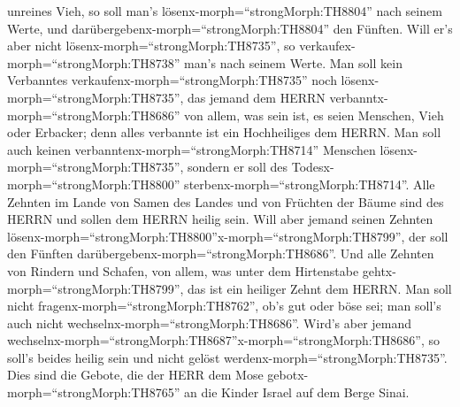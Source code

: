 unreines Vieh, so soll man's lösenx-morph=``strongMorph:TH8804'' nach
seinem Werte, und darübergebenx-morph=``strongMorph:TH8804'' den
Fünften. Will er's aber nicht lösenx-morph=``strongMorph:TH8735'', so
verkaufex-morph=``strongMorph:TH8738'' man's nach seinem Werte.
 Man soll kein Verbanntes
verkaufenx-morph=``strongMorph:TH8735'' noch
lösenx-morph=``strongMorph:TH8735'', das jemand dem HERRN
verbanntx-morph=``strongMorph:TH8686'' von allem, was sein ist, es seien
Menschen, Vieh oder Erbacker; denn alles verbannte ist ein Hochheiliges
dem HERRN.  Man soll auch keinen
verbanntenx-morph=``strongMorph:TH8714'' Menschen
lösenx-morph=``strongMorph:TH8735'', sondern er soll des
Todesx-morph=``strongMorph:TH8800''
sterbenx-morph=``strongMorph:TH8714''.  Alle Zehnten im
Lande von Samen des Landes und von Früchten der Bäume sind des HERRN und
sollen dem HERRN heilig sein.  Will aber jemand seinen
Zehnten
lösenx-morph=``strongMorph:TH8800''x-morph=``strongMorph:TH8799'', der
soll den Fünften darübergebenx-morph=``strongMorph:TH8686''.
 Und alle Zehnten von Rindern und Schafen, von allem, was
unter dem Hirtenstabe gehtx-morph=``strongMorph:TH8799'', das ist ein
heiliger Zehnt dem HERRN.  Man soll nicht
fragenx-morph=``strongMorph:TH8762'', ob's gut oder böse sei; man soll's
auch nicht wechselnx-morph=``strongMorph:TH8686''. Wird's aber jemand
wechselnx-morph=``strongMorph:TH8687''x-morph=``strongMorph:TH8686'', so
soll's beides heilig sein und nicht gelöst
werdenx-morph=``strongMorph:TH8735''.  Dies sind die
Gebote, die der HERR dem Mose gebotx-morph=``strongMorph:TH8765'' an die
Kinder Israel auf dem Berge Sinai.
